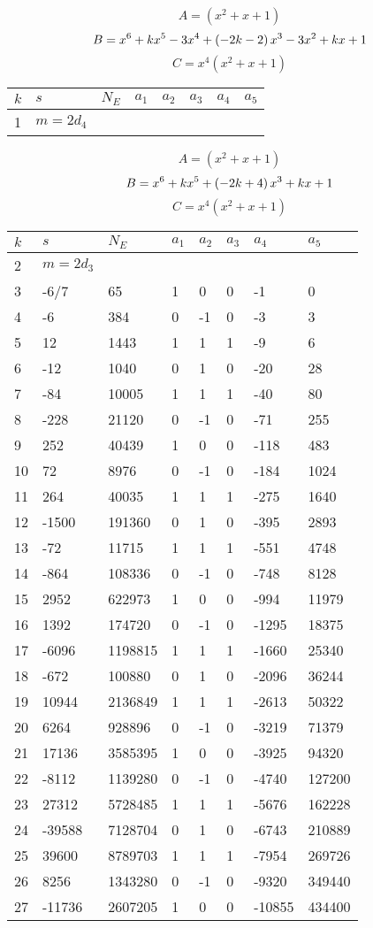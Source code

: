 \documentclass{amsart}
\begin{document}
$$A=(x^2
 + x
 + 1)$$
$$B=x^6
 + k\*x^5
 - 3\*x^4
 + \left(-2\*k
 - 2\right) \*x^3
 - 3\*x^2
 + k\*x
 + 1$$
$$C=x^4(x^2
 + x
 + 1)$$
\begin{longtable}{|l|l|l|lllll|}
\hline
$k$ & $s$ & $N_E$ & $a_1$ & $a_2$ & $a_3$ & $a_4$ & $a_5$\\
\hline
1&$m=2d_{4}$&&\multicolumn{5}{c|}{}\\
\hline
\end{longtable}
$$A=(x^2
 + x
 + 1)$$
$$B=x^6
 + k\*x^5
 + \left(-2\*k
 + 4\right) \*x^3
 + k\*x
 + 1$$
$$C=x^4(x^2
 + x
 + 1)$$
\begin{longtable}{|l|l|l|lllll|}
\hline
$k$ & $s$ & $N_E$ & $a_1$ & $a_2$ & $a_3$ & $a_4$ & $a_5$\\
\hline
2&$m=2d_{3}$&&\multicolumn{5}{c|}{}\\
3&-6/7&65&1&0&0&-1&0\\
4&-6&384&0&-1&0&-3&3\\
5&12&1443&1&1&1&-9&6\\
6&-12&1040&0&1&0&-20&28\\
7&-84&10005&1&1&1&-40&80\\
8&-228&21120&0&-1&0&-71&255\\
9&252&40439&1&0&0&-118&483\\
10&72&8976&0&-1&0&-184&1024\\
11&264&40035&1&1&1&-275&1640\\
12&-1500&191360&0&1&0&-395&2893\\
13&-72&11715&1&1&1&-551&4748\\
14&-864&108336&0&-1&0&-748&8128\\
15&2952&622973&1&0&0&-994&11979\\
16&1392&174720&0&-1&0&-1295&18375\\
17&-6096&1198815&1&1&1&-1660&25340\\
18&-672&100880&0&1&0&-2096&36244\\
19&10944&2136849&1&1&1&-2613&50322\\
20&6264&928896&0&-1&0&-3219&71379\\
21&17136&3585395&1&0&0&-3925&94320\\
22&-8112&1139280&0&-1&0&-4740&127200\\
23&27312&5728485&1&1&1&-5676&162228\\
24&-39588&7128704&0&1&0&-6743&210889\\
25&39600&8789703&1&1&1&-7954&269726\\
26&8256&1343280&0&-1&0&-9320&349440\\
27&-11736&2607205&1&0&0&-10855&434400\\

\end{longtable}
\end{document}
